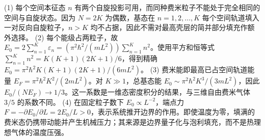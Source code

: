 (1) 每个空间本征态 \(n\) 有两个自旋投影可用，而同种费米粒子不能处于完全相同的空间与自旋状态。因为 \(N=2K\) 为偶数，基态在 \(n=1,2,\ldots,K\) 每个空间轨道填入一对反向自旋粒子，\(n>K\) 均不占据，因此不需对最高壳层的简并部分填充作额外选择。
(2) 每个能级占两粒子，故 \(E_0=2\sum_{n=1}^K\varepsilon_n=(\pi^2\hbar^2/(mL^2))\sum_{n=1}^Kn^2\)。使用平方和恒等式 \(\sum_{n=1}^Kn^2=K(K+1)(2K+1)/6\)，得到精确 \(E_0=\pi^2\hbar^2K(K+1)(2K+1)/(6mL^2)\)。
(3) 费米能即最高已占空间轨道能量 \(E_F=\pi^2\hbar^2K^2/(2mL^2)\)。对 \(K\gg1\)，总基态能 \(E_0\sim\pi^2\hbar^2K^3/(3mL^2)\)，因此 \(E_0/(NE_F)\to1/3\)。这一系数是一维态密度积分的结果，与三维自由费米气体 \(3/5\) 的系数不同。
(4) 在固定粒子数下 \(E_0\propto L^{-2}\)，端点力 \(F=-\partial E_0/\partial L=2E_0/L>0\)，表示系统推开边界的作用。即使温度为零，填满的费米态仍携带动能并产生机械压力；其来源是边界量子化与泡利填充，而不是热理想气体的温度压强。

